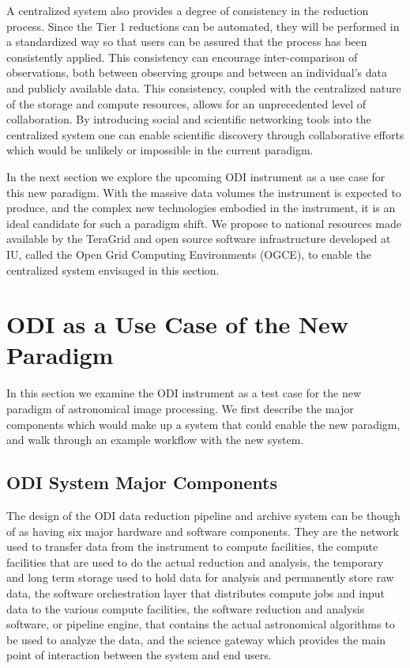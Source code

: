 \documentclass[10pt,conference]{IEEEtran}
\begin{document}
A centralized system also provides a degree of consistency in the reduction process. Since the Tier 1 reductions can be automated, they will be performed in a standardized way so that users can be assured that the process has been consistently applied. This consistency can encourage inter-comparison of observations, both between observing groups and between an individual's data and publicly available data. This consistency, coupled with the centralized nature of the storage and compute resources, allows for an unprecedented level of collaboration. By introducing social and scientific networking tools into the centralized system one can enable scientific discovery through collaborative efforts which would be unlikely or impossible in the current paradigm. 

In the next section we explore the upcoming ODI instrument as a use case for this new paradigm. With the massive data volumes the instrument is expected to produce, and the complex new technologies embodied in the instrument, it is an ideal candidate for such a paradigm shift. We propose to national resources made available by the TeraGrid and open source software infrastructure developed at IU, called the Open Grid Computing Environments (OGCE), to enable the centralized system envisaged in this section. 

\section{ODI as a Use Case of the New Paradigm}\label{sec:ODI}

In this section we examine the ODI instrument as a test case for the new paradigm of astronomical image processing. We first describe the major components which would make up a system that could enable the new paradigm, and walk through an example workflow with the new system. 

\subsection{ODI System Major Components}\label{sec:components}

The design of the ODI data reduction pipeline and archive system can be though of as having six major hardware and software components. They are the network used to transfer data from the instrument to compute facilities, the compute facilities that are used to do the actual reduction and analysis, the temporary and long term storage used to hold data for analysis and permanently store raw data, the software orchestration layer that distributes compute jobs and input data to the various compute facilities, the software reduction and analysis software, or pipeline engine, that contains the actual astronomical algorithms to be used to analyze the data, and the science gateway which provides the main point of interaction between the system and end users. 
\end{document}
